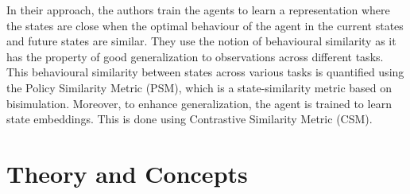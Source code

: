 \documentclass{usiinftr}
\begin{document}
In their approach, the authors train the agents to learn a representation where the states are close when the optimal behaviour of the agent in the current states and future states are similar. They use the notion of behavioural similarity as it has the property of good generalization to observations across different tasks. This behavioural similarity between states across various tasks is quantified using the Policy Similarity Metric (PSM), which is a state-similarity metric based on bisimulation. Moreover, to enhance generalization, the agent is trained to learn state embeddings. This is done using Contrastive Similarity Metric (CSM).


\section{Theory and Concepts}
\end{document}
